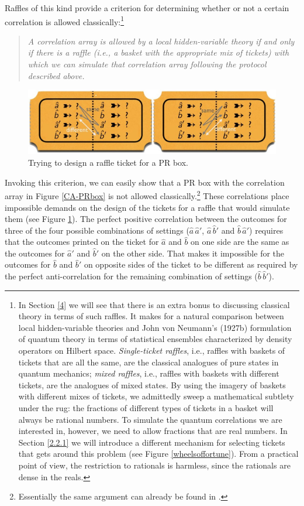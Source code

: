Raffles of this kind provide a criterion for determining whether or not a certain correlation is allowed classically:\footnote{In Section \ref{4} we will see that there is an extra bonus to discussing classical theory in terms of such raffles. It makes for a natural comparison between local hidden-variable theories and John von Neumann's (1927b) formulation of quantum theory in terms of statistical ensembles characterized by density operators on Hilbert space. \emph{Single-ticket raffles}, i.e., raffles with baskets of tickets that are all the same, are the classical analogues of pure states in quantum mechanics; \emph{mixed raffles}, i.e., raffles with baskets with different tickets, are the analogues of mixed states. By using the imagery of baskets with different mixes of tickets, we admittedly sweep a mathematical subtlety under the rug: the fractions of different types of tickets in a basket will always be rational numbers. To simulate the quantum correlations we are interested in, however, we need to allow fractions that are real numbers. In Section \ref{2.2.1} we will introduce a different mechanism for selecting tickets that gets around this problem (see Figure \ref{wheelsoffortune}). From a practical point of view, the restriction to rationals is harmless, since the rationals are dense in the reals.\label{dense}}
\begin{quote}
\emph{A correlation array is allowed by a local hidden-variable theory if and only if there is a raffle (i.e., a basket with the appropriate mix of tickets) with which we can simulate that correlation array following the protocol described above.}
\end{quote}

\begin{figure}[h]
 \centering
   \includegraphics[width=4.5in]{raffle-ticket-PRbox.jpeg} 
   \caption{Trying to design a raffle ticket for a PR box.}
   \label{raffle-ticket-PRbox}
\end{figure}

Invoking this criterion, we can easily show that a PR box with the correlation array in Figure \ref{CA-PRbox} is not allowed classically.\footnote{Essentially the same argument can already be found in \citet[p.\ 970]{Rastall 1995}.} These correlations place impossible demands on the design of the tickets for a raffle that would simulate them (see Figure \ref{raffle-ticket-PRbox}). The perfect positive correlation between the outcomes for three of the four possible combinations of settings ($\hat{a} \, \hat{a}'$, $\hat{a} \, \hat{b}'$ and $\hat{b} \, \hat{a}'$) requires that the outcomes printed on the ticket for $\hat{a}$ and $\hat{b}$ on one side are the same as the outcomes for $\hat{a}'$ and $\hat{b}'$ on the other side. That makes it impossible for the outcomes for $\hat{b}$ and $\hat{b}'$ on opposite sides of the ticket to be different as required by the perfect anti-correlation for the remaining combination of settings ($\hat{b} \, \hat{b}'$). 

